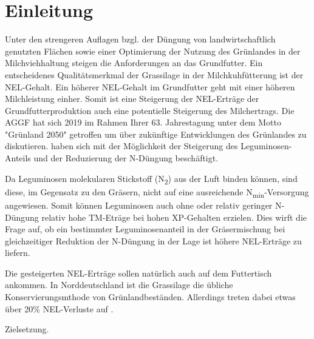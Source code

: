 

\section{Einleitung}
\label{sec:Einleitung}

Unter den strengeren Auflagen bzgl. der Düngung von landwirtschaftlich genutzten Flächen sowie einer Optimierung der Nutzung des Grünlandes in der Milchviehhaltung steigen die Anforderungen an das Grundfutter.
Ein entscheidenes Qualitätsmerkmal der Grassilage in der Milchkuhfütterung ist der \ac{NEL}-Gehalt.
Ein höherer \ac{NEL}-Gehalt im Grundfutter geht mit einer höheren Milchleistung einher.
Somit ist eine Steigerung der \ac{NEL}-Erträge der Grundfutterproduktion auch eine potentielle Steigerung des Milchertrags.
Die \ac{AGGF} hat sich 2019 im Rahmen Ihrer 63. Jahrestagung unter dem Motto "Grünland 2050" getroffen um über zukünftige Entwicklungen des Grünlandes zu diskutieren.
\textcite[33-36]{weggler2050leguminosen} haben sich mit der Möglichkeit der Steigerung des Leguminosen-Anteils und der Reduzierung der N-Düngung beschäftigt.

Da Leguminosen molekularen Stickstoff (N\textsubscript{2}) aus der Luft binden können, sind diese, im Gegensatz zu den Gräsern, nicht auf eine ausreichende N\textsubscript{min}-Versorgung angewiesen.
Somit können Leguminosen auch ohne oder relativ geringer N-Düngung relativ hohe \ac{TM}-Eträge bei hohen \ac{XP}-Gehalten erzielen.
Dies wirft die Frage auf, ob ein bestimmter Leguminosenanteil in der Gräsermischung bei gleichzeitiger Reduktion der N-Düngung in der Lage ist höhere \ac{NEL}-Erträge zu liefern.

Die gesteigerten \ac{NEL}-Erträge sollen natürlich auch auf dem Futtertisch ankommen.
In Norddeutschland ist die Grassilage die übliche Konservierungsmthode von Grünlandbeständen.
Allerdings treten dabei etwas über 20\% \ac{NEL}-Verluste auf \parencite[30]{fritz2018wirtschaftliche}.

Zielsetzung.
